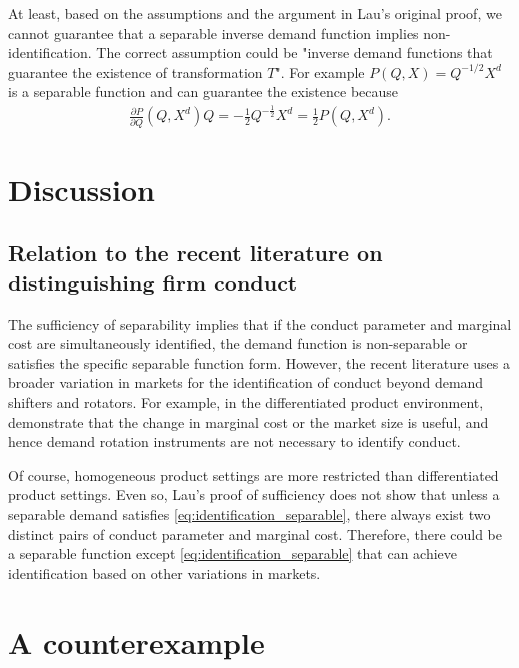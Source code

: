 \documentclass[11pt, a4paper]{article}
\theoremstyle{remark}
\begin{document}
At least, based on the assumptions and the argument in Lau's original proof, we cannot guarantee that a separable inverse demand function implies non-identification.
The correct assumption could be "inverse demand functions that guarantee the existence of transformation $T$".
For example $P(Q, X) = Q^{-1/2}X^{d}$ is a separable function and can guarantee the existence because 
\begin{align}
    \frac{\partial P}{\partial Q}(Q, X^{d})Q  = -\frac{1}{2}Q^{-\frac{1}{2}}X^d = \frac{1}{2}P(Q,X^{d}).
\end{align}



\section{Discussion}

\subsection{Relation to the recent literature on distinguishing firm conduct}

The sufficiency of separability implies that if the conduct parameter and marginal cost are simultaneously identified, the demand function is non-separable or satisfies the specific separable function form.
However, the recent literature uses a broader variation in markets for the identification of conduct beyond demand shifters and rotators.
For example, in the differentiated product environment, \citet{berry2014identification} demonstrate that the change in marginal cost or the market size is useful, and hence demand rotation instruments are not necessary to identify conduct.

Of course, homogeneous product settings are more restricted than differentiated product settings.
Even so, Lau's proof of sufficiency does not show that unless a separable demand satisfies  \eqref{eq:identification_separable}, there always exist two distinct pairs of conduct parameter and marginal cost.
Therefore, there could be a separable function except \eqref{eq:identification_separable} that can achieve identification based on other variations in markets.



\newpage


\appendix

\section{A counterexample}
\end{document}
